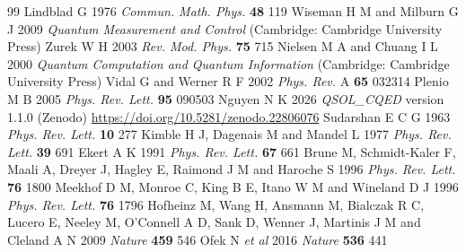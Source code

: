 \documentclass{iopjournal}
\begin{document}
\begin{thebibliography}{99}
 Lindblad G 1976 {\it Commun. Math. Phys.} {\bf 48} 119
 Wiseman H M and Milburn G J 2009 {\it Quantum Measurement and Control} (Cambridge: Cambridge University Press)
 Zurek W H 2003 {\it Rev. Mod. Phys.} {\bf 75} 715
 Nielsen M A and Chuang I L 2000 {\it Quantum Computation and Quantum Information} (Cambridge: Cambridge University Press)
 Vidal G and Werner R F 2002 {\it Phys. Rev.} A {\bf 65} 032314
 Plenio M B 2005 {\it Phys. Rev. Lett.} {\bf 95} 090503
 Nguyen N K 2026 {\it QSOL\_CQED} version 1.1.0 (Zenodo) \url{https://doi.org/10.5281/zenodo.22806076}
 Sudarshan E C G 1963 {\it Phys. Rev. Lett.} {\bf 10} 277
 Kimble H J, Dagenais M and Mandel L 1977 {\it Phys. Rev. Lett.} {\bf 39} 691
 Ekert A K 1991 {\it Phys. Rev. Lett.} {\bf 67} 661
 Brune M, Schmidt-Kaler F, Maali A, Dreyer J, Hagley E, Raimond J M and Haroche S 1996 {\it Phys. Rev. Lett.} {\bf 76} 1800
 Meekhof D M, Monroe C, King B E, Itano W M and Wineland D J 1996 {\it Phys. Rev. Lett.} {\bf 76} 1796
 Hofheinz M, Wang H, Ansmann M, Bialczak R C, Lucero E, Neeley M, O'Connell A D, Sank D, Wenner J, Martinis J M and Cleland A N 2009 {\it Nature} {\bf 459} 546
 Ofek N {\it et al} 2016 {\it Nature} {\bf 536} 441
\end{thebibliography}
\end{document}
